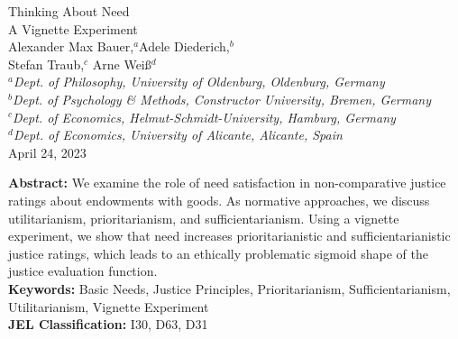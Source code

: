 \documentclass[12pt]{scrartcl}
\begin{document}
\thispagestyle{empty}
\renewcommand{\thefootnote}{\fnsymbol{footnote}}
\begin{center}
{\LARGE Thinking About Need}\\\vspace{2ex}
{\Large A Vignette Experiment}\\\vspace{6ex}
{\large Alexander Max Bauer,$^a$\footnotemark[1] Adele Diederich,$^b$\\Stefan Traub,$^{c}$ Arne Weiß$^d$}\\\vspace{3ex}
\textsl{\small $^{a}$Dept. of Philosophy, University of Oldenburg, Oldenburg, Germany}\\\vspace{1ex}
\textsl{\small $^{b}$Dept. of Psychology \& Methods, Constructor University, Bremen, Germany}\\\vspace{1ex}
\textsl{\small $^{c}$Dept. of Economics, Helmut-Schmidt-University, Hamburg, Germany}\\\vspace{1ex}
\textsl{\small $^{d}$Dept. of Economics, University of Alicante, Alicante, Spain}\\\vspace{3ex}
April 24, 2023
\end{center}

\vspace{\fill}

\noindent\textbf{Abstract:} We examine the role of need satisfaction in non-comparative justice ratings about endowments with goods. 
As normative approaches, we discuss utilitarianism, prioritarianism, and sufficientarianism.
Using a vignette experiment, we show that need increases prioritarianistic and sufficientarianistic justice ratings, which leads to an ethically problematic sigmoid shape of the justice evaluation function.
\\[2ex]
\noindent\textbf{Keywords:} Basic Needs, Justice Principles, Prioritarianism, Sufficientarianism, Utilitarianism, Vignette Experiment\\[2ex]
\textbf{JEL Classification:} I30, D63, D31

\renewcommand{\thefootnote}{\arabic{footnote}}\setcounter{footnote}{0}
\newpage
\end{document}
